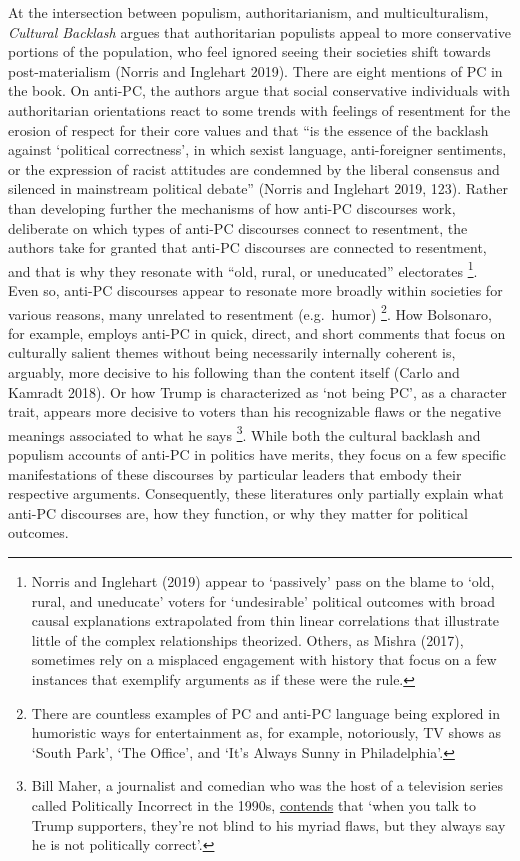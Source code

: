 \documentclass[smallextended]{svjour3}       %
\begin{document}
At the intersection between populism, authoritarianism, and
multiculturalism, \emph{Cultural Backlash} argues that authoritarian
populists appeal to more conservative portions of the population, who
feel ignored seeing their societies shift towards post-materialism
(Norris and Inglehart 2019). There are eight mentions of PC in the book.
On anti-PC, the authors argue that social conservative individuals with
authoritarian orientations react to some trends with feelings of
resentment for the erosion of respect for their core values and that
``is the essence of the backlash against `political correctness', in
which sexist language, anti-foreigner sentiments, or the expression of
racist attitudes are condemned by the liberal consensus and silenced in
mainstream political debate'' (Norris and Inglehart 2019, 123). Rather
than developing further the mechanisms of how anti-PC discourses work,
deliberate on which types of anti-PC discourses connect to resentment,
the authors take for granted that anti-PC discourses are connected to
resentment, and that is why they resonate with ``old, rural, or
uneducated'' electorates \footnote{ Norris and Inglehart (2019) appear
  to `passively' pass on the blame to `old, rural, and uneducate' voters
  for `undesirable' political outcomes with broad causal explanations
  extrapolated from thin linear correlations that illustrate little of
  the complex relationships theorized. Others, as Mishra (2017),
  sometimes rely on a misplaced engagement with history that focus on a
  few instances that exemplify arguments as if these were the rule.}.
Even so, anti-PC discourses appear to resonate more broadly within
societies for various reasons, many unrelated to resentment (e.g.~humor)
\footnote{ There are countless examples of PC and anti-PC language being
  explored in humoristic ways for entertainment as, for example,
  notoriously, TV shows as `South Park', `The Office', and `It's Always
  Sunny in Philadelphia'.}. How Bolsonaro, for example, employs anti-PC
in quick, direct, and short comments that focus on culturally salient
themes without being necessarily internally coherent is, arguably, more
decisive to his following than the content itself (Carlo and Kamradt
2018). Or how Trump is characterized as `not being PC', as a character
trait, appears more decisive to voters than his recognizable flaws or
the negative meanings associated to what he says \footnote{ Bill Maher,
  a journalist and comedian who was the host of a television series
  called Politically Incorrect in the 1990s,
  \href{https://www.youtube.com/watch?v=CCQ3VyKe1Vs}{contends} that
  `when you talk to Trump supporters, they're not blind to his myriad
  flaws, but they always say he is not politically correct'.}. While
both the cultural backlash and populism accounts of anti-PC in politics
have merits, they focus on a few specific manifestations of these
discourses by particular leaders that embody their respective arguments.
Consequently, these literatures only partially explain what anti-PC
discourses are, how they function, or why they matter for political
outcomes.
\end{document}
